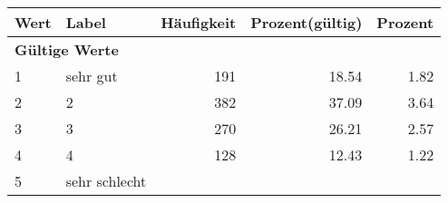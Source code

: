      \begin{longtable}{lXrrr}
     \toprule
     \textbf{Wert} & \textbf{Label} & \textbf{Häufigkeit} & \textbf{Prozent(gültig)} & \textbf{Prozent} \\
     \endhead
     \midrule
     \multicolumn{5}{l}{\textbf{Gültige Werte}}\\

     1 &
     \multicolumn{1}{X}{ sehr gut   } &


       \num{191} &
       \num[round-mode=places,round-precision=2]{18.54} &
         \num[round-mode=places,round-precision=2]{1.82} \\

     2 &
     \multicolumn{1}{X}{ 2   } &


       \num{382} &
       \num[round-mode=places,round-precision=2]{37.09} &
         \num[round-mode=places,round-precision=2]{3.64} \\

     3 &
     \multicolumn{1}{X}{ 3   } &


       \num{270} &
       \num[round-mode=places,round-precision=2]{26.21} &
         \num[round-mode=places,round-precision=2]{2.57} \\

     4 &
     \multicolumn{1}{X}{ 4   } &


       \num{128} &
       \num[round-mode=places,round-precision=2]{12.43} &
         \num[round-mode=places,round-precision=2]{1.22} \\

     5 &
     \multicolumn{1}{X}{ sehr schlecht   } &



\end{longtable}
